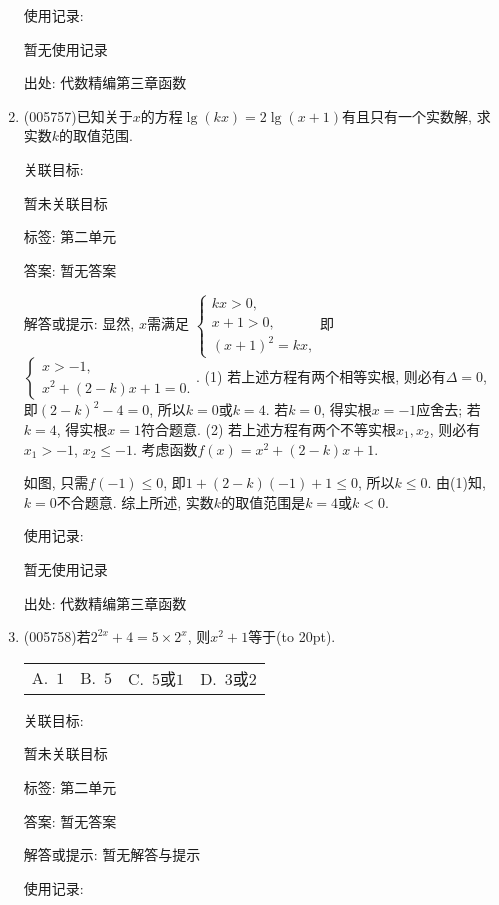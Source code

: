 \documentclass[10pt,a4paper]{article}
\newcommand{\bracket}[1]{(\hbox to #1pt{})}
\newcommand{\fourch}[4]{\par\begin{tabular}{p{.23\textwidth}p{.23\textwidth}p{.23\textwidth}p{.23\textwidth}}
A.~#1 &B.~#2& C.~#3& D.~#4
\end{tabular}}
\begin{document}
\begin{enumerate}[1.]
使用记录:

暂无使用记录


出处: 代数精编第三章函数
\item { (005757)}已知关于$x$的方程$\lg (kx)=2\lg (x+1)$有且只有一个实数解, 求实数$k$的取值范围.


关联目标:

暂未关联目标



标签: 第二单元

答案: 暂无答案

解答或提示: 显然, $x$需满足
$\begin{cases} kx>0, \\ x+1>0, \\ (x+1)^2=kx, \end{cases}$即$\begin{cases} x>-1, \\ x^2+(2-k)x+1=0. \end{cases}$.
(1) 若上述方程有两个相等实根, 则必有$\Delta =0$, 即$(2-k)^2-4=0$,
所以$ k=0$或$k=4$.
若$k=0$, 得实根$x=-1$应舍去; 若$k=4$, 得实根$x=1$符合题意.
(2) 若上述方程有两个不等实根$x_1,x_2$,
则必有$x_1>-1$, $x_2\le -1$.
考虑函数$f(x)=x^2+(2-k)x+1$.
\begin{center}
\end{center}
如图, 只需$f(-1)\le 0$, 即$1+(2-k)(-1)+1\le 0$,
所以$ k\le 0$. 由(1)知, $k=0$不合题意.
综上所述, 实数$k$的取值范围是$k=4$或$k<0$.

使用记录:

暂无使用记录


出处: 代数精编第三章函数
\item { (005758)}若$2^{2x}+4=5\times 2^x$, 则$x^2+1$等于\bracket{20}.
\fourch{$1$}{$5$}{$5$或$1$}{$3$或$2$}


关联目标:

暂未关联目标



标签: 第二单元

答案: 暂无答案

解答或提示: 暂无解答与提示

使用记录:


\end{enumerate}
\end{document}
